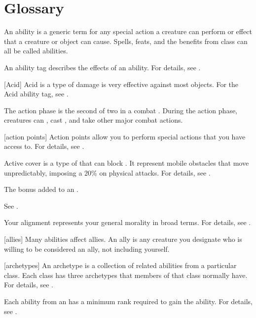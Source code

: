 \chapter{Glossary}\label{Glossary}

 An ability is a generic term for any special action a creature can perform or effect that a creature or object can cause.
Spells, feats, and the benefits from class  can all be called abilities.

 An ability tag describes the effects of an ability.
For details, see .

[Acid] Acid is a type of damage is very effective against most objects.
For the Acid ability tag, see .

 The action phase is the second of two  in a combat .
During the action phase, creatures can , cast , and take other major combat actions.

[action points] Action points allow you to perform special actions that you have access to.
For details, see .

 Active cover is a type of  that can block .
It represent mobile obstacles that move unpredictably, imposing a 20\%  on physical attacks.
For details, see .

 The bonus added to an .

 See .

 Your alignment represents your general morality in broad terms.
For details, see .

[allies] Many abilities affect allies.
An ally is any creature you designate who is willing to be considered an ally, not including yourself.

[archetypes] An archetype is a collection of related abilities from a particular class.
Each class has three archetypes that members of that class normally have.
For details, see .

 Each ability from an  has a minimum rank required to gain the ability.
For details, see .

